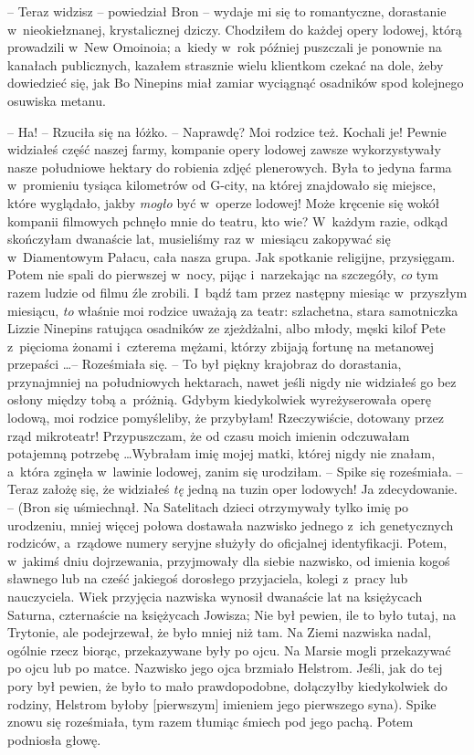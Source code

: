 \documentclass[oneside,polish,11pt,rmheadings]{mwbk}
\begin{document}
  -- Teraz widzisz -- powiedział Bron -- wydaje mi się to romantyczne, dorastanie w~nieokiełznanej, krystalicznej dziczy. Chodziłem do każdej opery lodowej, którą prowadzili w~New Omoinoia; a~kiedy w~rok później puszczali je ponownie na kanałach publicznych, kazałem strasznie wielu klientkom czekać na dole, żeby dowiedzieć się, jak Bo Ninepins miał zamiar wyciągnąć osadników spod kolejnego osuwiska metanu. 

-- Ha! -- Rzuciła się na łóżko. -- Naprawdę? Moi rodzice też. Kochali je! Pewnie widziałeś część naszej farmy, kompanie opery lodowej zawsze wykorzystywały nasze południowe hektary do robienia zdjęć plenerowych. Była to jedyna farma w~promieniu tysiąca kilometrów od G-city, na której znajdowało się miejsce, które wyglądało, jakby \textit{mogło }być w~operze lodowej! Może kręcenie się wokół kompanii filmowych pchnęło mnie do teatru, kto wie? W~każdym razie, odkąd skończyłam dwanaście lat, musieliśmy raz w~miesiącu zakopywać się w~Diamentowym Pałacu, cała nasza grupa. Jak spotkanie religijne, przysięgam. Potem nie spali do pierwszej w~nocy, pijąc i~narzekając na szczegóły, \textit{co} tym razem ludzie od filmu źle zrobili. I~bądź tam przez następny miesiąc w~przyszłym miesiącu, \textit{to }właśnie moi rodzice uważają za teatr: szlachetna, stara samotniczka Lizzie Ninepins ratująca osadników ze zjeżdżalni, albo młody, męski kilof Pete z~pięcioma żonami i~czterema mężami, którzy zbijają fortunę na metanowej przepaści \ldots  -- Roześmiała się. -- To był piękny krajobraz do dorastania, przynajmniej na południowych hektarach, nawet jeśli nigdy nie widziałeś go bez osłony między tobą a~próżnią. Gdybym kiedykolwiek wyreżyserowała operę lodową, moi rodzice pomyśleliby, że przybyłam! Rzeczywiście, dotowany przez rząd mikroteatr! Przypuszczam, że od czasu moich imienin odczuwałam potajemną potrzebę \ldots   Wybrałam imię mojej matki, której nigdy nie znałam, a~która zginęła w~lawinie lodowej, zanim się urodziłam. -- Spike się roześmiała.  -- Teraz założę się, że widziałeś \textit{tę }jedną na tuzin oper lodowych! Ja zdecydowanie. -- (Bron się uśmiechnął. Na Satelitach dzieci otrzymywały tylko imię po urodzeniu, mniej więcej połowa dostawała nazwisko jednego z~ich genetycznych rodziców, a~rządowe numery seryjne służyły do oficjalnej identyfikacji. Potem, w~jakimś dniu dojrzewania, przyjmowały dla siebie nazwisko, od imienia kogoś sławnego lub na cześć jakiegoś dorosłego przyjaciela, kolegi z~pracy lub nauczyciela. Wiek przyjęcia nazwiska wynosił dwanaście lat na księżycach Saturna, czternaście na księżycach Jowisza; Nie był pewien, ile to było tutaj, na Trytonie, ale podejrzewał, że było mniej niż tam. Na Ziemi nazwiska nadal, ogólnie rzecz biorąc, przekazywane były po ojcu. Na Marsie mogli przekazywać po ojcu lub po matce. Nazwisko jego ojca brzmiało Helstrom. Jeśli, jak do tej pory był pewien, że było to mało prawdopodobne, dołączyłby kiedykolwiek do rodziny, Helstrom byłoby [pierwszym] imieniem jego pierwszego syna). Spike znowu się roześmiała, tym razem tłumiąc śmiech pod jego pachą. Potem podniosła głowę.  
\end{document}
